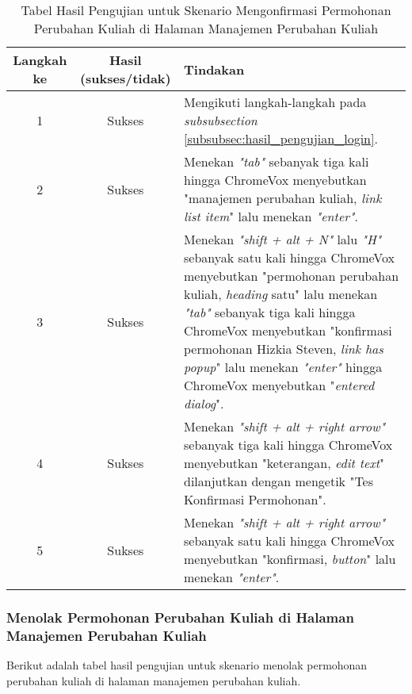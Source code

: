 \begin{table}[H]
    \centering 
    \caption{Tabel Hasil Pengujian untuk Skenario Mengonfirmasi Permohonan Perubahan Kuliah di Halaman Manajemen Perubahan Kuliah}
    \label{tab:hasil_pengujian_mengonfirmasi_permohonan_perubahan_kuliah_di_halaman_manajemen_perubahan_kuliah}
    \begin{tabular}{|c|c|p{10cm}|}
        \toprule
        Langkah ke & Hasil (sukses/tidak) & Tindakan \\

        \midrule
        1 & Sukses & Mengikuti langkah-langkah pada \textit{subsubsection} \ref{subsubsec:hasil_pengujian_login}. \\
        2 & Sukses & Menekan \textit{"tab"} sebanyak tiga kali hingga ChromeVox menyebutkan "manajemen perubahan kuliah, \textit{link list item}" lalu menekan \textit{"enter"}. \\
        3 & Sukses & Menekan \textit{"shift + alt + N"} lalu \textit{"H"} sebanyak satu kali hingga ChromeVox menyebutkan "permohonan perubahan kuliah, \textit{heading} satu" lalu menekan \textit{"tab"} sebanyak tiga kali hingga ChromeVox menyebutkan "konfirmasi permohonan Hizkia Steven, \textit{link has popup}" lalu menekan \textit{"enter"} hingga ChromeVox menyebutkan "\textit{entered dialog}". \\
        4 & Sukses & Menekan \textit{"shift + alt + right arrow"} sebanyak tiga kali hingga ChromeVox menyebutkan "keterangan, \textit{edit text}" dilanjutkan dengan mengetik "Tes Konfirmasi Permohonan". \\
        5 & Sukses & Menekan \textit{"shift + alt + right arrow"} sebanyak satu kali hingga ChromeVox menyebutkan "konfirmasi, \textit{button}" lalu menekan \textit{"enter"}. \\ 

        \bottomrule

    \end{tabular}
\end{table}

\subsubsection{Menolak Permohonan Perubahan Kuliah di Halaman Manajemen Perubahan Kuliah}
\label{subsubsec:hasil_pengujian_menolak_permohonan_perubahan_kuliah_di_halaman_manajemen_perubahan_kuliah}
Berikut adalah tabel hasil pengujian untuk skenario menolak permohonan perubahan kuliah di halaman manajemen perubahan kuliah.

